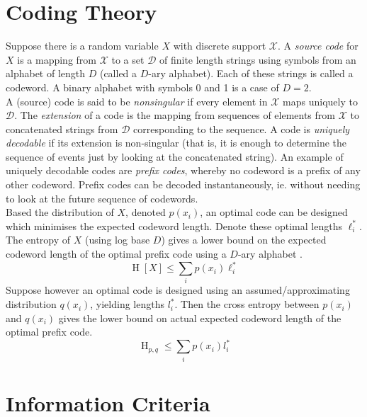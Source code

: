 \documentclass[11pt]{report} %
\begin{document}
\section{Coding Theory \cite{Cover2006}}

Suppose there is a random variable $X$ with discrete support $\mathcal{X}$. A \textit{source code} for $X$ is a mapping from $\mathcal{X}$ to a set $\mathcal{D}$ of finite length strings using symbols from an alphabet of length $D$ (called a $D$-ary alphabet). Each of these strings is called a codeword. A binary alphabet with symbols 0 and 1 is a case of $D = 2$. \\

A (source) code is said to be \textit{nonsingular} if every element in $\mathcal{X}$ maps uniquely to $\mathcal{D}$. The \textit{extension} of a code is the mapping from sequences of elements from $\mathcal{X}$ to concatenated strings from $\mathcal{D}$ corresponding to the sequence. A code is \textit{uniquely decodable} if its extension is non-singular (that is, it is enough to determine the sequence of events just by looking at the concatenated string). An example of uniquely decodable codes are \textit{prefix codes}, whereby no codeword is a prefix of any other codeword. Prefix codes can be decoded instantaneously, ie. without needing to look at the future sequence of codewords. \\

Based the distribution of $X$, denoted $p\left(x_{i}\right)$, an optimal code can be designed which minimises the expected codeword length. Denote these optimal lengths $\ell_{i}^{*}$. The entropy of $X$ (using log base $D$) gives a lower bound on the expected codeword length of the optimal prefix code using a $D$-ary alphabet \cite{Cover2006}.
\begin{equation}
\operatorname{H}\left[X\right] \leq \sum_{i}p\left(x_{i}\right)\ell_{i}^{*}
\end{equation}
Suppose however an optimal code is designed using an assumed/approximating distribution $q\left(x_{i}\right)$, yielding lengths $l_{i}^{*}$. Then the cross entropy between $p\left(x_{i}\right)$ and $q\left(x_{i}\right)$ gives the lower bound on actual expected codeword length of the optimal prefix code.
\begin{equation}
\operatorname{H}_{p, q} \leq \sum_{i}p\left(x_{i}\right)l_{i}^{*}
\end{equation}

\section{Information Criteria}
\end{document}

